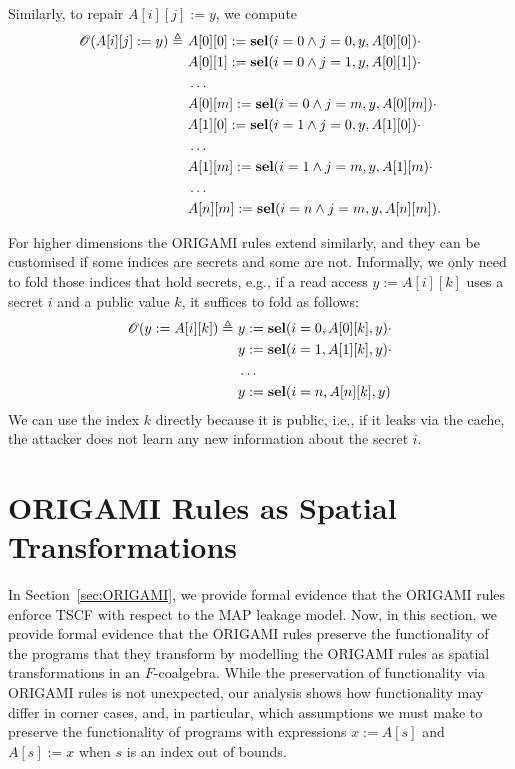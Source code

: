 Similarly, to repair $A[i][j]:=y$, we compute
\begin{align*}
    \mathscr{O}(A[i][j]:=y)\triangleq\  
    &A[0][0]:=\textbf{sel}(i=0\land j=0,y,A[0][0])\cdot \\
    &A[0][1]:=\textbf{sel}(i=0\land j=1,y,A[0][1])\cdot \\
    &\ldots\\
    &A[0][m]:=\textbf{sel}(i=0\land j=m,y,A[0][m])\cdot \\
    &A[1][0]:=\textbf{sel}(i=1\land j=0,y,A[1][0])\cdot \\
    &\ldots\\
    &A[1][m]:=\textbf{sel}(i=1\land j=m,y,A[1][m)\cdot \\
    &\ldots\\
    &A[n][m]:=\textbf{sel}(i=n\land j=m,y,A[n][m]).
\end{align*}

For higher dimensions the ORIGAMI rules extend similarly, and they can be customised if some indices are secrets and some are not. Informally, we only need to fold those indices that hold secrets, e.g., if a read access $y:=A[i][k]$ uses a secret $i$ and a public value $k$, it suffices to fold as follows: 
\begin{align*}
    \mathscr{O}(y:=A[i][k])\triangleq\  
    &y:=\sel(i=0,A[0][k],y)\cdot \\
    &y:=\sel(i=1,A[1][k],y)\cdot \\
    &\ldots\\
    &y:=\sel(i=n,A[n][k],y)%
\end{align*}
We can use the index $k$ directly because it is public, i.e., if it leaks via the cache, the attacker does not learn any new information about the secret $i$.

\section{ORIGAMI Rules as Spatial Transformations}
In Section~\ref{sec:ORIGAMI}, we provide formal evidence that the ORIGAMI rules enforce TSCF with respect to the MAP leakage model. Now, in this section, we provide formal evidence that the ORIGAMI rules preserve the functionality of the programs that they transform by modelling the ORIGAMI rules as spatial transformations in an $F$-coalgebra. While the preservation of functionality via ORIGAMI rules is not unexpected, our analysis shows how functionality may differ in corner cases, and, in particular, which assumptions we must make to preserve the functionality of programs with expressions $x:=A[s]$ and $A[s]:=x$ when $s$ is an index out of bounds. 

